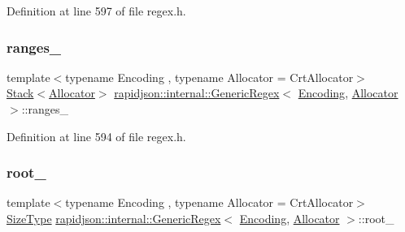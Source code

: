 Definition at line 597 of file regex.\+h.

\mbox{\label{classrapidjson_1_1internal_1_1_generic_regex_ae7852f12a1477320042acd5e1e5a7eae}} 
\subsubsection{\texorpdfstring{ranges\_}{ranges\_}}
{\footnotesize\ttfamily template$<$typename Encoding , typename Allocator  = Crt\+Allocator$>$ \\
\mbox{\hyperlink{classrapidjson_1_1internal_1_1_stack}{Stack}}$<$\mbox{\hyperlink{classrapidjson_1_1_allocator}{Allocator}}$>$ \mbox{\hyperlink{classrapidjson_1_1internal_1_1_generic_regex}{rapidjson\+::internal\+::\+Generic\+Regex}}$<$ \mbox{\hyperlink{classrapidjson_1_1_encoding}{Encoding}}, \mbox{\hyperlink{classrapidjson_1_1_allocator}{Allocator}} $>$\+::ranges\+\_\+\hspace{0.3cm}{\ttfamily [private]}}



Definition at line 594 of file regex.\+h.

\mbox{\label{classrapidjson_1_1internal_1_1_generic_regex_a1c8ff11634f38e18d2794f58b77b7cff}} 
\subsubsection{\texorpdfstring{root\_}{root\_}}
{\footnotesize\ttfamily template$<$typename Encoding , typename Allocator  = Crt\+Allocator$>$ \\
\mbox{\hyperlink{namespacerapidjson_a44eb33eaa523e36d466b1ced64b85c84}{Size\+Type}} \mbox{\hyperlink{classrapidjson_1_1internal_1_1_generic_regex}{rapidjson\+::internal\+::\+Generic\+Regex}}$<$ \mbox{\hyperlink{classrapidjson_1_1_encoding}{Encoding}}, \mbox{\hyperlink{classrapidjson_1_1_allocator}{Allocator}} $>$\+::root\+\_\+\hspace{0.3cm}{\ttfamily [private]}}



